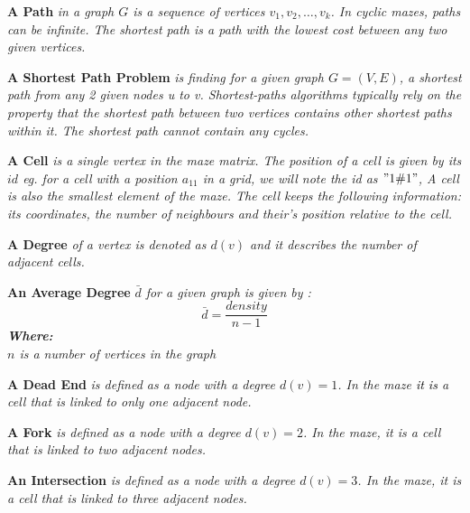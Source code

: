 \begin{definition}\textbf{A Path } \emph{in a graph $G$ is a sequence of vertices $v_1, v_2,\ldots,v_k$. In cyclic mazes, paths can be infinite. The shortest path is a path with the lowest cost between any two given vertices.\cite{Erickson}}\end{definition}
\begin{definition}\textbf{A Shortest Path Problem } \emph{is finding for a given graph $G = (V,E)$, a shortest path from any 2 given nodes \textit{u} to \textit{v}. Shortest-paths algorithms typically rely on the property that the shortest path between two vertices contains other shortest paths within it.
The shortest path cannot contain any cycles.\cite{Trudeau}}\end{definition}
\begin{definition}\textbf{A Cell} \emph{is a single vertex in the maze matrix. The position of a cell is given by its $id$ eg. for a cell with a position $a_{11}$ in a grid, we will note the id as $"1\char"0023 1"$, A cell is also the smallest element of the maze. The cell keeps the following information: its coordinates, the number of neighbours and their’s position relative to the cell.}\end{definition}
\begin{definition}\textbf{A Degree } \emph{of a vertex is denoted as $d(v)$ and it describes the number of adjacent cells.\cite{Hofstad}}\end{definition}
\begin{definition}\textbf{An Average Degree }\emph{ $\bar{d}$ for a given graph is given by \cite{Hofstad}:\\
\begin{equation}
\bar{d} = \frac{density}{n-1}	
\end{equation}
\textbf{Where:}\\
$n$ is a number of vertices in the graph\\	
}\end{definition}
\begin{definition}\textbf{A Dead End} \emph{ is defined as a node with a degree $d(v) = 1$. In the maze \textcolor{black}{it is} a cell that is linked to only one adjacent node.}\end{definition}
\begin{definition}\textbf{A Fork} \emph{is defined as a node with a degree $d(v) = 2$. In the maze, it is a cell that is linked to two adjacent nodes.}\end{definition}
\begin{definition}\textbf{An Intersection} \emph{ is defined as a node with a degree $d(v) = 3$. In the maze, it is a cell that is linked to three adjacent nodes.}\end{definition}
